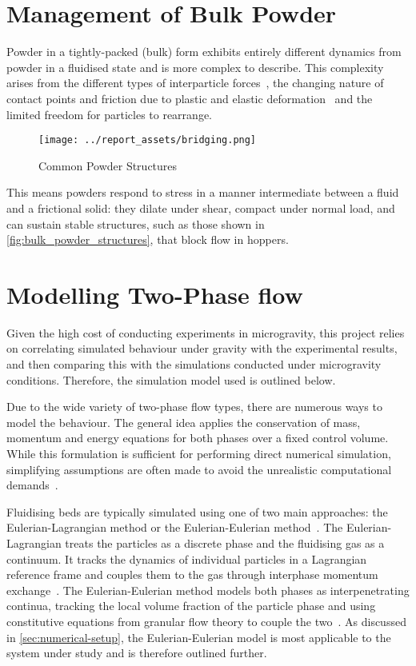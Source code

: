 \section{Management of Bulk Powder}\label{sec:bulk-powder}
Powder in a tightly-packed (bulk) form exhibits entirely different dynamics from powder in a fluidised state and is more complex to describe. This complexity arises from the different types of interparticle forces~\cite{ZAFAR2017389}, the changing nature of contact points and friction due to plastic and elastic deformation~\cite{TALEBI2024211} and the limited freedom for particles to rearrange. 
\begin{figure}[htbp]
    \centering
    \begin{minipage}{0.6\textwidth}
        \centering
        \texttt{[image: ../report\_assets/bridging.png]}
        \caption{Common Powder Structures~\cite{911Metallurgist_binsflow}}\label{fig:bulk_powder_structures}
    \end{minipage}
\end{figure}
This means powders respond to stress in a manner intermediate between a fluid and a frictional solid: they dilate under shear, compact under normal load, and can sustain stable structures, such as those shown in \autoref{fig:bulk_powder_structures}, that block flow in hoppers. 
\section{Modelling Two-Phase flow}
Given the high cost of conducting experiments in microgravity, this project relies on correlating simulated behaviour under gravity with the experimental results, and then comparing this with the simulations conducted under microgravity conditions. Therefore, the simulation model used is outlined below.

Due to the wide variety of two-phase flow types, there are numerous ways to model the behaviour.  The general idea applies the conservation of mass, momentum and energy equations for both phases over a fixed control volume. While this formulation is sufficient for performing direct numerical simulation, simplifying assumptions are often made to avoid the unrealistic computational demands~\cite{enwald1996eulerian}. 

Fluidising beds are typically simulated using one of two main approaches: the Eulerian-Lagrangian method or the Eulerian-Eulerian method~\cite{C6RA28615A}. The Eulerian-Lagrangian treats the particles as a discrete phase and the fluidising gas as a continuum. It tracks the dynamics of individual particles in a Lagrangian reference frame and couples them to the gas through interphase momentum exchange~\cite{SUBRAMANIAM2013215}. The Eulerian-Eulerian method models both phases as interpenetrating continua, tracking the local volume fraction of the particle phase and using constitutive equations from granular flow theory to couple the two~\cite{C6RA28615A}. As discussed in \autoref{sec:numerical-setup}, the Eulerian-Eulerian model is most applicable to the system under study and is therefore outlined further.

